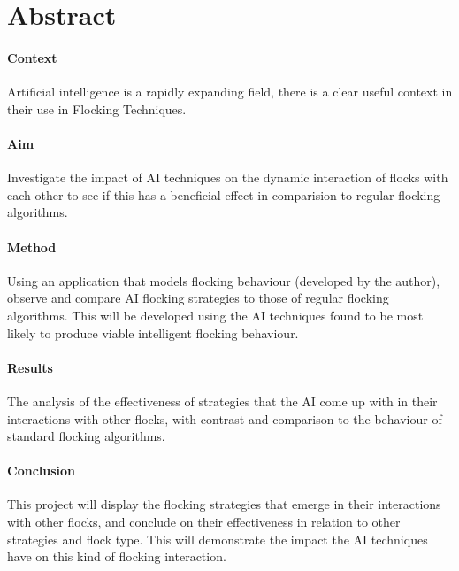 
\section{Abstract}
	
	\paragraph{Context}
	Artificial intelligence is a rapidly expanding field, there is a clear useful context in their use in Flocking Techniques.
	
	\paragraph{Aim}
	Investigate the impact of AI techniques on the dynamic interaction of flocks with each other to see if this has a 
	beneficial effect in comparision to regular flocking algorithms.
	
	\paragraph{Method}
	Using an application that models flocking behaviour (developed by the author), observe and compare AI flocking strategies
	to those of regular flocking algorithms. This will be developed using the AI techniques found to be most likely to produce 
	viable intelligent flocking behaviour.
	
	\paragraph{Results}
	The analysis of the effectiveness of strategies that the AI come up with in their interactions with other flocks, with
	contrast and comparison to the behaviour of standard flocking algorithms.
	
	\paragraph{Conclusion}
	This project will display the flocking strategies that emerge in their interactions with other flocks, and conclude on their
	effectiveness in relation to other strategies and flock type. This will demonstrate the impact the AI techniques have on
	this kind of flocking interaction.
